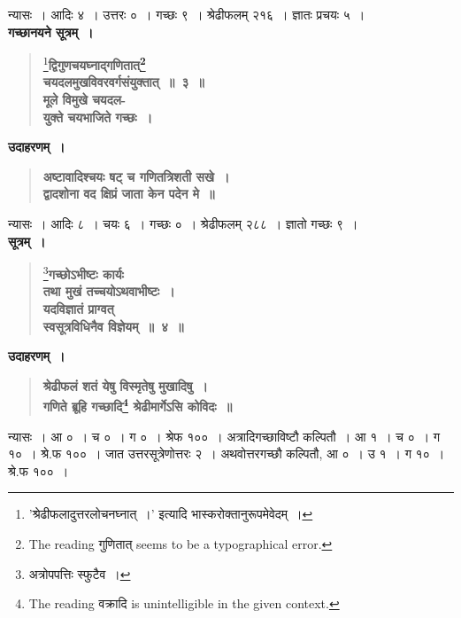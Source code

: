 \documentclass[11pt, openany]{book}
\begin{document}
\newpage

न्यासः~। आदिः ४~। उत्तरः ०~। गच्छः ९~। श्रेढीफलम् २१६~। ज्ञातः प्रचयः ५~। \\

\noindent \textbf{गच्छानयने सूत्रम्~।}

 \label{3.3}
\begin{quote}
\renewcommand{\thefootnote}{१}\footnote{{\color{violet}'श्रेढीफलादुत्तरलोचनघ्नात्~।'} इत्यादि {\color{violet}भास्करो}क्तानुरूपमेवेदम्~।}{\large \textbf{{\color{purple}द्विगुणचयघ्नाद्गणितात्\renewcommand{\thefootnote}{$\star$}\footnote{The reading गुणितात् seems to be a typographical error.} \\
चयदलमुखविवरवर्गसंयुक्तात्~॥~३~॥\\
मूले विमुखे चयदल-\\
युक्ते चयभाजिते गच्छः~।}}}
\end{quote}

\noindent \textbf{उदाहरणम्~।}

 \label{Ex 3.5}
\begin{quote}
\textbf{{\color{red}अष्टावादिश्चयः षट् च गणितत्रिशती सखे~।\\
द्वादशोना वद क्षिप्रं जाता केन पदेन मे~॥}}
\end{quote}

न्यासः~। आदिः ८~। चयः ६~। गच्छः ०~। श्रेढीफलम् २८८~। ज्ञातो गच्छः ९~। \\

\noindent \textbf{सूत्रम्~।}

 \label{3.4}
\begin{quote}
\renewcommand{\thefootnote}{२}\footnote{अत्रोपपत्तिः स्फुटैव~।}{\large \textbf{{\color{purple}गच्छोऽभीष्टः कार्यः \\
तथा मुखं तच्चयोऽथवाभीष्टः~।\\
यदविज्ञातं प्राग्वत् \\
स्वसूत्रविधिनैव विज्ञेयम्~॥~४~॥}}}
\end{quote}

\noindent \textbf{उदाहरणम्~।}

 \label{Ex 3.6}
\begin{quote}
\textbf{{\color{red}श्रेढीफलं शतं येषु विस्मृतेषु मुखादिषु~।\\
गणिते ब्रूहि गच्छादि\renewcommand{\thefootnote}{$\dag$}\footnote{The reading वक्रादि is unintelligible in the given context.} श्रेढीमार्गेऽसि कोविदः~॥}}
\end{quote}

न्यासः~। आ ०~। च ०~। ग ०~। श्रेफ १००~। अत्रादिगच्छाविष्टौ कल्पितौ~। आ १~। च ०~। ग १०~। श्रे.फ १००~। जात उत्तरसूत्रेणोत्तरः २~। अथवोत्तरगच्छौ कल्पितौ, आ ०~। उ १~। ग १०~। श्रे.फ १००~। 
\end{document}
